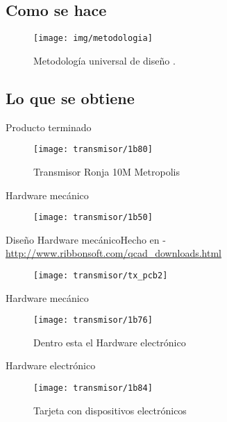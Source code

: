 \message{ !name(alternativa.tex)}\documentclass{beamer}
\begin{document}
\subsection{Como se hace}

\begin{frame}
  \begin{figure}
    \texttt{[image: img/metodologia]}
    \caption{Metodología universal de diseño \cite{Guillermo}.}
    \label{fig:metodologia}
  \end{figure}
\end{frame}

\subsection{Lo que se obtiene}

\begin{frame}{Producto terminado}
  \begin{figure}
    \texttt{[image: transmisor/1b80]}
    \caption{Transmisor Ronja 10M Metropolis}
  \end{figure}
\end{frame}

\begin{frame}{Hardware mecánico}
  \begin{figure}
    \texttt{[image: transmisor/1b50]}
  \end{figure}
\end{frame}

\begin{frame}{Diseño Hardware mecánico}{Hecho en \alert{} - \url{http://www.ribbonsoft.com/qcad_downloads.html}}
  \begin{figure}
    \texttt{[image: transmisor/tx\_pcb2]}
  \end{figure}
\end{frame}

\begin{frame}{Hardware mecánico}
  \begin{figure}
    \texttt{[image: transmisor/1b76]}
    \caption{Dentro esta el Hardware electrónico}
  \end{figure}
\end{frame}

\begin{frame}{Hardware electrónico}
  \begin{figure}
    \texttt{[image: transmisor/1b84]}
    \caption{Tarjeta con dispositivos electrónicos}
  \end{figure}
\end{frame}
\end{document}

